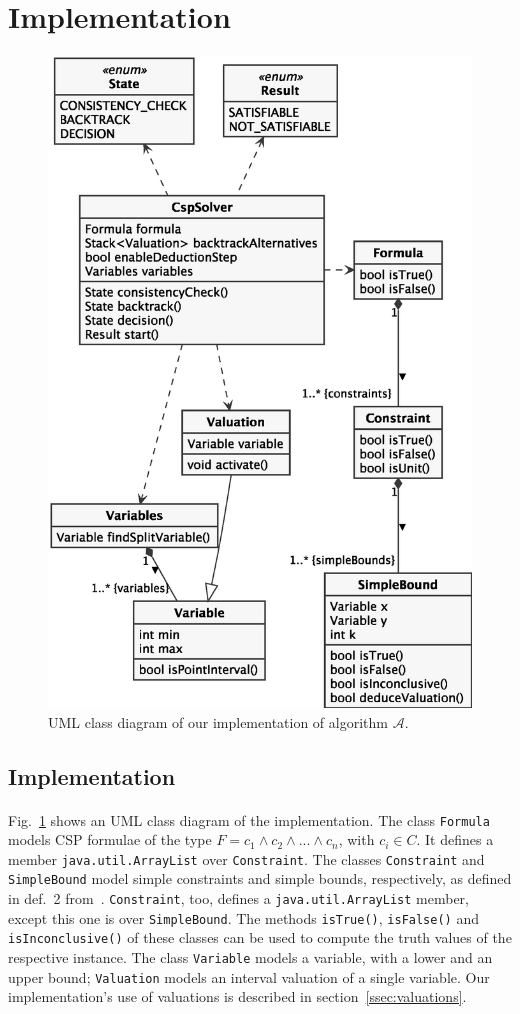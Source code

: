\section{Implementation}

\begin{figure}[H]
    \centering
    \includegraphics[width=.6\textwidth]{images/class-diagram}
    \caption{UML class diagram of our implementation of algorithm $\mathcal{A}$.}
    \label{fig:class-diagram}
\end{figure}


\subsection{Implementation}

\paragraph{}
Fig.~\ref{fig:class-diagram} shows an UML class diagram of the implementation.
The class \texttt{Formula} models CSP formulae of the type $F = c_1 \wedge c_2 \wedge ... \wedge c_n$, with $c_i \in C$.
It defines a member \texttt{java.util.ArrayList} over \texttt{Constraint}.
The classes \texttt{Constraint} and \texttt{SimpleBound} model simple constraints and simple bounds, respectively, as defined in def.~2 from~\cite{MF19}.
\texttt{Constraint}, too, defines a \texttt{java.util.ArrayList} member, except this one is over \texttt{SimpleBound}.
The methods \texttt{isTrue()}, \texttt{isFalse()} and \texttt{isInconclusive()} of these classes can be used to compute the truth values of the respective instance.
The class \texttt{Variable} models a variable, with a lower and an upper bound; \texttt{Valuation} models an interval valuation of a single variable.
Our implementation's use of valuations is described in section~\ref{ssec:valuations}.

